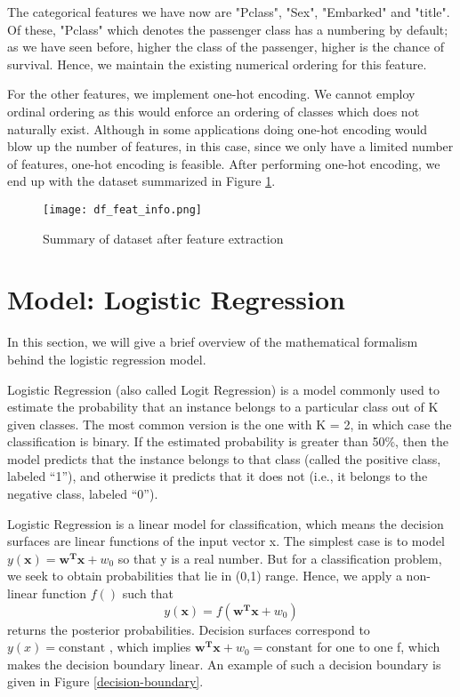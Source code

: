 \documentclass[conference]{IEEEtran}
\begin{document}
The categorical features we have now are "Pclass", "Sex", "Embarked" and "title". Of these, "Pclass" which denotes the passenger class has a numbering by default; as we have seen before, higher the class of the passenger, higher is the chance of survival. Hence, we maintain the existing numerical ordering for this feature.

For the other features, we implement one-hot encoding. We cannot employ ordinal ordering as this would enforce an ordering of classes which does not naturally exist. Although in some applications doing one-hot encoding would blow up the number of features, in this case, since we only have a limited number of features, one-hot encoding is feasible. After performing one-hot encoding, we end up with the dataset summarized in Figure \ref{df_feat_info}.

\begin{figure}[tbh]
\centering
\texttt{[image: df\_feat\_info.png]}
\caption{Summary of dataset after feature extraction}
\label{df_feat_info}
\end{figure}



\section{Model: Logistic Regression}

In this section, we will give a brief overview of the mathematical formalism behind the logistic regression model. 

Logistic Regression (also called Logit Regression) is a model commonly used to estimate the probability that an instance belongs to a particular class out of K given classes. The most common version is the one with K = 2, in which case the classification is binary. If the estimated probability is greater than 50\%, then the model predicts that the instance belongs to that class (called the positive class, labeled “1”), and otherwise it predicts that it does not (i.e., it belongs to the negative class, labeled “0”).

Logistic Regression is a linear model for classification, which means the decision
surfaces are linear functions of the input vector x. The simplest case is to model $y(\mathbf{x}) = \mathbf{w^Tx} + w_0$ so that y is a real number. But for a classification problem, we seek to
obtain probabilities that lie in (0,1) range. Hence, we apply a
non-linear function $f ()$ such that $$y(\mathbf{x}) = f(\mathbf{w^Tx }+ w_0 )$$ returns the posterior probabilities. Decision surfaces correspond to $y(x) = \textrm{constant}$ , which implies $\mathbf{w^Tx} + w_0 = \textrm{constant}$ for one to one f, which makes the decision boundary linear. An example of such a decision boundary is given in Figure \ref{decision-boundary}.
\end{document}
